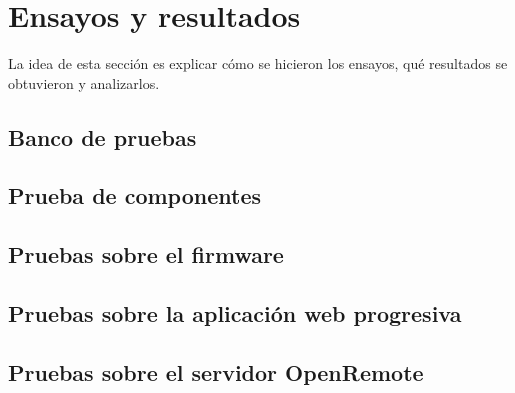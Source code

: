 
\chapter{Ensayos y resultados} %

\label{Chapter4} %


La idea de esta sección es explicar cómo se hicieron los ensayos, qué resultados se obtuvieron y analizarlos.

\section{Banco de pruebas}



\section{Prueba de componentes}

\section{Pruebas sobre el firmware}

\section{Pruebas sobre la aplicación web progresiva}

\section{Pruebas sobre el servidor OpenRemote}
